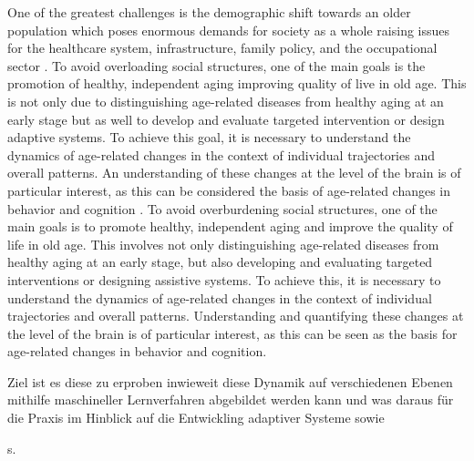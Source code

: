 One of the greatest challenges is the demographic shift towards an older population which poses enormous demands for society as a whole raising issues for the healthcare system, infrastructure, family policy, and the occupational sector \cite{who_aging2023}. To avoid overloading social structures, one of the main goals is the promotion of healthy, independent aging improving quality of live in old age. This is not only due to distinguishing age-related diseases from healthy aging at an early stage but as well to develop and evaluate targeted intervention or design adaptive systems. To achieve this goal, it is necessary to understand the dynamics of age-related changes in the context of individual trajectories and overall patterns. An understanding of these changes at the level of the brain is of particular interest, as this can be considered the basis of age-related changes in behavior and cognition \cite{}. To avoid overburdening social structures, one of the main goals is to promote healthy, independent aging and improve the quality of life in old age. This involves not only distinguishing age-related diseases from healthy aging at an early stage, but also developing and evaluating targeted interventions or designing assistive systems. To achieve this, it is necessary to understand the dynamics of age-related changes in the context of individual trajectories and overall patterns. Understanding and quantifying these changes at the level of the brain is of particular interest, as this can be seen as the basis for age-related changes in behavior and cognition. 




Ziel ist es diese zu erproben inwieweit diese Dynamik auf verschiedenen Ebenen mithilfe maschineller Lernverfahren abgebildet werden kann und was daraus für die Praxis im Hinblick auf die Entwickling adaptiver Systeme sowie 

s. 





